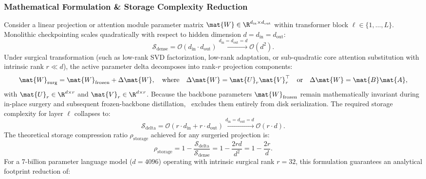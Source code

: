 \subsubsection{Mathematical Formulation \& Storage Complexity Reduction}
Consider a linear projection or attention module parameter matrix $\mat{W} \in \R^{d_{\text{in}} \times d_{\text{out}}}$ within transformer block $\ell \in \{1, \dots, L\}$. Monolithic checkpointing scales quadratically with respect to hidden dimension $d = d_{\text{in}} = d_{\text{out}}$:
\begin{equation}
    \mathcal{S}_{\text{dense}} = \mathcal{O}(d_{\text{in}} \cdot d_{\text{out}}) \xrightarrow{d_{\text{in}} = d_{\text{out}} = d} \mathcal{O}(d^2).
    \label{eq:dense_storage_order}
\end{equation}
Under surgical transformation (such as low-rank SVD factorization, low-rank adaptation, or sub-quadratic core attention substitution with intrinsic rank $r \ll d$), the active parameter delta decomposes into rank-$r$ projection components:
\begin{equation}
    \mat{W}_{\text{surg}} = \mat{W}_{\text{frozen}} + \Delta \mat{W}, \quad \text{where} \quad \Delta \mat{W} = \mat{U}_r \mat{V}_r^\top \quad \text{or} \quad \Delta \mat{W} = \mat{B}\mat{A},
    \label{eq:delta_decomposition_math}
\end{equation}
with $\mat{U}_r \in \R^{d \times r}$ and $\mat{V}_r \in \R^{d \times r}$. Because the backbone parameters $\mat{W}_{\text{frozen}}$ remain mathematically invariant during in-place surgery and subsequent frozen-backbone distillation, \neuralops\ excludes them entirely from disk serialization. The required storage complexity for layer $\ell$ collapses to:
\begin{equation}
    \mathcal{S}_{\text{delta}} = \mathcal{O}(r \cdot d_{\text{in}} + r \cdot d_{\text{out}}) \xrightarrow{d_{\text{in}} = d_{\text{out}} = d} \mathcal{O}(r \cdot d).
    \label{eq:delta_storage_order}
\end{equation}
The theoretical storage compression ratio $\rho_{\text{storage}}$ achieved for any surgeried projection is:
\begin{equation}
    \rho_{\text{storage}} = 1 - \frac{\mathcal{S}_{\text{delta}}}{\mathcal{S}_{\text{dense}}} = 1 - \frac{2 r d}{d^2} = 1 - \frac{2 r}{d}.
    \label{eq:theoretical_storage_ratio}
\end{equation}
For a 7-billion parameter language model ($d = 4096$) operating with intrinsic surgical rank $r = 32$, this formulation guarantees an analytical footprint reduction of:
